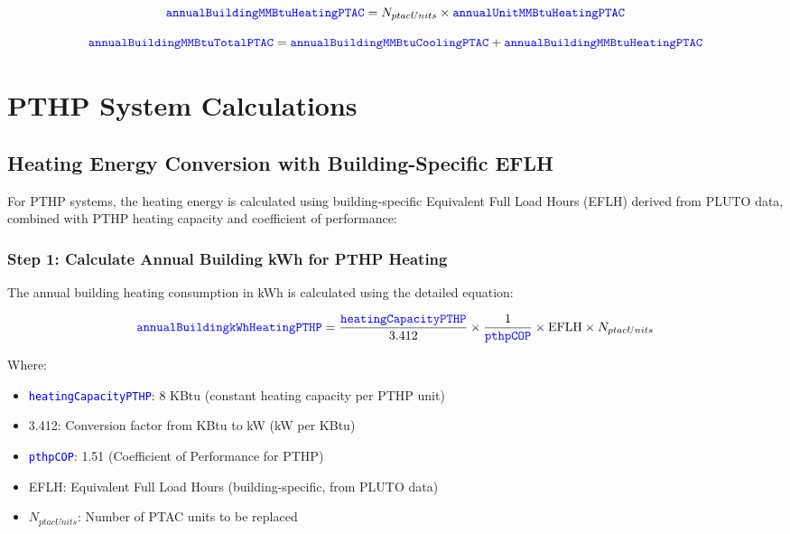 \documentclass{article}
\newcommand{\code}[1]{\textcolor{blue}{\texttt{#1}}}
\begin{document}
\begin{equation}
\code{annualBuildingMMBtuHeatingPTAC} = N_{ptacUnits} \times \code{annualUnitMMBtuHeatingPTAC}
\end{equation}

\begin{equation}
\code{annualBuildingMMBtuTotalPTAC} = \code{annualBuildingMMBtuCoolingPTAC} + \code{annualBuildingMMBtuHeatingPTAC}
\end{equation}


\section{PTHP System Calculations}

\subsection{Heating Energy Conversion with Building-Specific EFLH}

For PTHP systems, the heating energy is calculated using building-specific Equivalent Full Load Hours (EFLH) derived from PLUTO data, combined with PTHP heating capacity and coefficient of performance:

\subsubsection{Step 1: Calculate Annual Building kWh for PTHP Heating}

The annual building heating consumption in kWh is calculated using the detailed equation:

\begin{equation}
\code{annualBuildingkWhHeatingPTHP} = \frac{\code{heatingCapacityPTHP}}{3.412} \times \frac{1}{\code{pthpCOP}} \times \text{EFLH} \times N_{ptacUnits}
\end{equation}

Where:
\begin{itemize}
    \item \code{heatingCapacityPTHP}: 8 KBtu (constant heating capacity per PTHP unit)
    \item 3.412: Conversion factor from KBtu to kW (kW per KBtu)
    \item \code{pthpCOP}: 1.51 (Coefficient of Performance for PTHP)
    \item EFLH: Equivalent Full Load Hours (building-specific, from PLUTO data)
    \item $N_{ptacUnits}$: Number of PTAC units to be replaced
\end{itemize}
\end{document}
